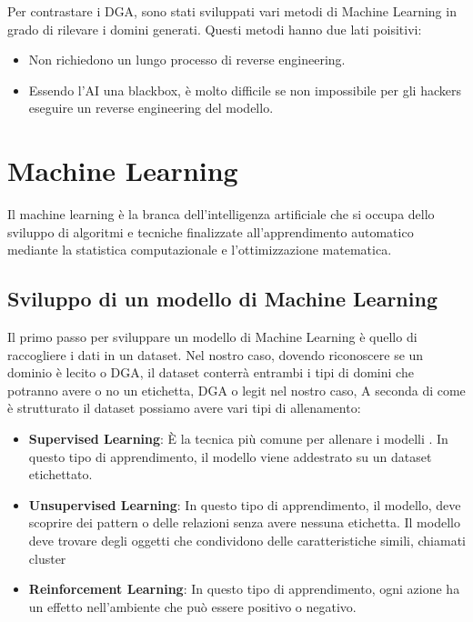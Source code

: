 \documentclass[12pt,a4paper,openright,twoside]{book}
\begin{document}
Per contrastare i DGA, sono stati sviluppati
vari metodi di Machine Learning in grado di rilevare i domini generati.
Questi metodi hanno due lati poisitivi:
\begin{itemize}
    \item Non richiedono un lungo processo di reverse engineering.
    \item Essendo l'AI una blackbox, è molto difficile se non impossibile
    per gli hackers eseguire un reverse engineering del modello.
\end{itemize}

\section{Machine Learning}
Il machine learning è la branca dell'intelligenza artificiale che si occupa dello sviluppo
di algoritmi e tecniche finalizzate all'apprendimento automatico mediante
la statistica computazionale e l'ottimizzazione matematica.\cite{treccani2024}

\subsection{Sviluppo di un modello di Machine Learning}
Il primo passo per sviluppare un modello di Machine Learning è quello di
raccogliere i dati in un dataset. Nel nostro caso, dovendo riconoscere se un dominio
è lecito o DGA, il dataset conterrà
entrambi i tipi di domini che potranno avere o no un etichetta, DGA o legit nel nostro caso,
A seconda di come è strutturato il dataset possiamo avere vari tipi di allenamento:

\begin{itemize}
    \item \textbf{Supervised Learning}: È la tecnica più comune
    per allenare i modelli \cite{ayodele2010types}. In questo tipo di apprendimento,
    il modello viene addestrato su un dataset etichettato.
    \item \textbf{Unsupervised Learning}: In questo tipo di apprendimento,
    il modello, deve scoprire dei pattern o delle relazioni
    senza avere nessuna etichetta. Il modello deve trovare
    degli oggetti che condividono delle caratteristiche simili, chiamati
    cluster
    \item \textbf{Reinforcement Learning}: In questo tipo di apprendimento,
    ogni azione ha un effetto nell'ambiente che può essere positivo
    o negativo.
\end{itemize}
\end{document}
